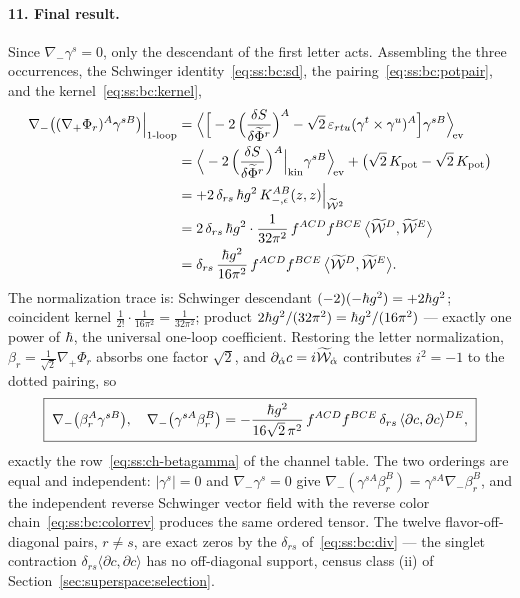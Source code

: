 \paragraph{11. Final result.}
Since $\nabla_{-}\gamma^{s}=0$, only the descendant of the first letter acts.
Assembling the three occurrences, the Schwinger identity~\eqref{eq:ss:bc:sd},
the pairing~\eqref{eq:ss:bc:potpair}, and the kernel~\eqref{eq:ss:bc:kernel},
\begin{equation}\label{eq:ss:bc:assembly}
\begin{aligned}
\nabla_{-}\big((\nabla_{+}\Phi_{r})^{A}\gamma^{sB}\big)
\Big|_{\mathrm{1\text{-}loop}}
&=\Big\langle\Big[
-2\,\Big(\frac{\delta S}{\delta\widetilde\Phi^{r}}\Big)^{A}
-\sqrt2\,\varepsilon_{rtu}(\gamma^{t}\times\gamma^{u})^{A}
\Big]\gamma^{sB}\Big\rangle_{\!\mathrm{ev}}\\
&=\Big\langle
-2\,\Big(\frac{\delta S}{\delta\widetilde\Phi^{r}}\Big)^{A}
\Big|_{\mathrm{kin}}\gamma^{sB}\Big\rangle_{\!\mathrm{ev}}
+\big(\sqrt2\,K_{\mathrm{pot}}-\sqrt2\,K_{\mathrm{pot}}\big)\\
&=+2\,\delta_{rs}\,\hbar g^{2}\,
K_{-,\epsilon}^{AB}(z,z)\Big|_{\widetilde{\mathcal{W}}^{2}}\\
&=2\,\delta_{rs}\,\hbar g^{2}\cdot\frac{1}{32\pi^{2}}\,
f^{ACD}f^{BCE}\,\big\langle\widetilde{\mathcal{W}}^{D},\widetilde{\mathcal{W}}^{E}\big\rangle\\
&=\delta_{rs}\,\frac{\hbar g^{2}}{16\pi^{2}}\,
f^{ACD}f^{BCE}\,\big\langle\widetilde{\mathcal{W}}^{D},\widetilde{\mathcal{W}}^{E}\big\rangle .
\end{aligned}
\end{equation}
The normalization trace is: Schwinger descendant $(-2)(-\hbar g^{2})=+2\hbar g^{2}$;
coincident kernel $\tfrac{1}{2!}\cdot\tfrac{1}{16\pi^{2}}=\tfrac{1}{32\pi^{2}}$;
product $2\hbar g^{2}/(32\pi^{2})=\hbar g^{2}/(16\pi^{2})$ --- exactly one power of
$\hbar$, the universal one-loop coefficient. Restoring the letter normalization,
$\beta_{r}=\tfrac{1}{\sqrt2}\nabla_{+}\Phi_{r}$ absorbs one factor $\sqrt2$,
and $\partial_{\dot\alpha}c=i\widetilde{\mathcal{W}}_{\dot\alpha}$ contributes $i^{2}=-1$ to the
dotted pairing, so
\begin{equation}\label{eq:ss:bc:result}
\boxed{\;
\nabla_{-}\big(\beta_{r}^{A}\gamma^{sB}\big),\quad
\nabla_{-}\big(\gamma^{sA}\beta_{r}^{B}\big)
=-\frac{\hbar g^{2}}{16\sqrt2\,\pi^{2}}\,f^{ACD}f^{BCE}\,
\delta_{rs}\,\langle\partial c,\partial c\rangle^{DE} ,\;}
\end{equation}
exactly the row~\eqref{eq:ss:ch-betagamma} of the channel table. The two
orderings are equal and independent: $|\gamma^{s}|=0$ and
$\nabla_{-}\gamma^{s}=0$ give
$\nabla_{-}(\gamma^{sA}\beta_{r}^{B})=\gamma^{sA}\nabla_{-}\beta_{r}^{B}$, and
the independent reverse Schwinger vector field with the reverse color
chain~\eqref{eq:ss:bc:colorrev} produces the same ordered tensor. The twelve
flavor-off-diagonal pairs, $r\neq s$, are exact zeros by the $\delta_{rs}$
of~\eqref{eq:ss:bc:div} --- the singlet contraction
$\delta_{rs}\langle\partial c,\partial c\rangle$ has no off-diagonal support,
census class (ii) of Section~\ref{sec:superspace:selection}.

